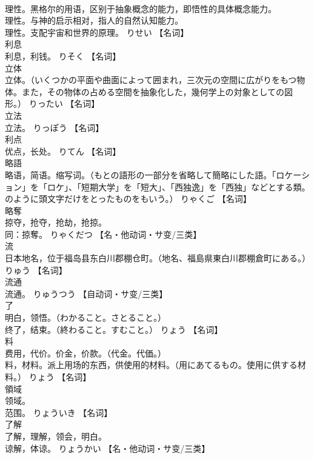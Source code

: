 \documentclass[8pt]{extreport}
\begin{document}
\begin{CJK}{UTF8}{min}
\\	理性。黑格尔的用语，区别于抽象概念的能力，即悟性的具体概念能力。 
\\	理性。与神的启示相对，指人的自然认知能力。 
\\	理性。支配宇宙和世界的原理。	りせい		【名词】
\\	利息	
\\	利息，利钱。	りそく		【名词】
\\	立体	
\\	立体。（いくつかの平面や曲面によって囲まれ，三次元の空間に広がりをもつ物体。また，その物体の占める空間を抽象化した，幾何学上の対象としての図形。）	りったい		【名词】
\\	立法	
\\	立法。	りっぽう		【名词】
\\	利点	
\\	优点，长处。	りてん		【名词】
\\	略語	
\\	略语，简语。缩写词。（もとの語形の一部分を省略して簡略にした語。「ロケーション」を「ロケ」、「短期大学」を「短大」、「西独逸」を「西独」などとする類。
\\	のように頭文字だけをとったものをもいう。）	りゃくご		【名词】
\\	略奪	
\\	掠夺，抢夺，抢劫，抢掠。 
\\	同：掠奪。	りゃくだつ		【名・他动词・サ变/三类】
\\	流	
\\	日本地名，位于福岛县东白川郡棚仓町。（地名、福島県東白川郡棚倉町にある。）	りゅう		【名词】
\\	流通	
\\	流通。	りゅうつう		【自动词・サ变/三类】
\\	了	
\\	明白，领悟。（わかること。さとること。） 
\\	终了，结束。（終わること。すむこと。）	りょう		【名词】
\\	料	
\\	费用，代价。价金，价款。（代金。代価。） 
\\	料，材料。派上用场的东西，供使用的材料。（用にあてるもの。使用に供する材料。）	りょう		【名词】
\\	領域	
\\	领域。 
\\	范围。	りょういき		【名词】
\\	了解	
\\	了解，理解，领会，明白。 
\\	谅解，体谅。	りょうかい		【名・他动词・サ变/三类】

\end{CJK}
\end{document}
